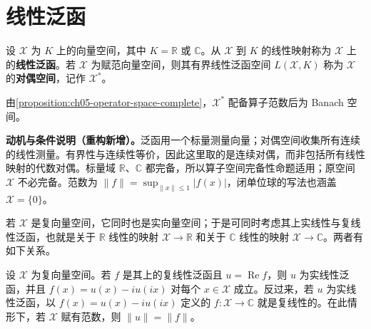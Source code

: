 \documentclass[../../main.tex]{subfiles}
\begin{document}
\section{线性泛函}\label{section:ch05-linear-functionals}
\begin{definition}[线性泛函与对偶空间]\label{definition:ch05-dual-space}
设 $\mathcal X$ 为 $K$ 上的向量空间，其中 $K=\mathbb R$ 或 $\mathbb C$。从 $\mathcal X$ 到 $K$ 的线性映射称为 $\mathcal X$ 上的\textbf{线性泛函}。若 $\mathcal X$ 为赋范向量空间，则其有界线性泛函空间 $L(\mathcal X,K)$ 称为 $\mathcal X$ 的\textbf{对偶空间}，记作 $\mathcal X^*$。
\end{definition}
由\cref{proposition:ch05-operator-space-complete}，$\mathcal X^*$ 配备算子范数后为 Banach 空间。
\begin{remark}
\textbf{动机与条件说明（重构新增）。}泛函用一个标量测量向量；对偶空间收集所有连续的线性测量。有界性与连续性等价，因此这里取的是连续对偶，而非包括所有线性映射的代数对偶。标量域 $\mathbb R$、$\mathbb C$ 都完备，所以算子空间完备性命题适用；原空间 $\mathcal X$ 不必完备。范数为 $\|f\|=\sup_{\|x\|\le1}|f(x)|$，闭单位球的写法也涵盖 $\mathcal X=\{0\}$。
\end{remark}
若 $\mathcal X$ 是复向量空间，它同时也是实向量空间；于是可同时考虑其上实线性与复线性泛函，也就是关于 $\mathbb R$ 线性的映射 $\mathcal X\to\mathbb R$ 和关于 $\mathbb C$ 线性的映射 $\mathcal X\to\mathbb C$。两者有如下关系。
\begin{proposition}\label{proposition:ch05-real-complex-functionals}
设 $\mathcal X$ 为复向量空间。若 $f$ 是其上的复线性泛函且 $u=\operatorname{Re}f$，则 $u$ 为实线性泛函，并且 $f(x)=u(x)-iu(ix)$ 对每个 $x\in\mathcal X$ 成立。反过来，若 $u$ 为实线性泛函，以 $f(x)=u(x)-iu(ix)$ 定义的 $f:\mathcal X\to\mathbb C$ 就是复线性的。在此情形下，若 $\mathcal X$ 赋有范数，则 $\|u\|=\|f\|$。
\end{proposition}
\end{document}
